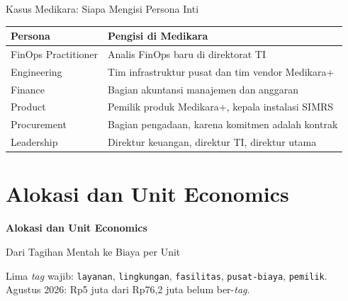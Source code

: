 \documentclass[aspectratio=169, table, 12pt]{beamer}
\begin{document}
\begin{frame}{{\Large Kasus Medikara: Siapa Mengisi Persona Inti}}
  \footnotesize
  \begin{tabularx}{\textwidth}{>{\raggedright\arraybackslash}p{3.4cm}
      >{\raggedright\arraybackslash}X}
    \hline
    \textbf{Persona} & \textbf{Pengisi di Medikara} \\
    \hline
    FinOps Practitioner & Analis FinOps baru di direktorat TI \\
    \hline
    Engineering & Tim infrastruktur pusat dan tim vendor Medikara+ \\
    \hline
    Finance & Bagian akuntansi manajemen dan anggaran \\
    \hline
    Product & Pemilik produk Medikara+, kepala instalasi SIMRS \\
    \hline
    Procurement & Bagian pengadaan, karena komitmen adalah kontrak \\
    \hline
    Leadership & Direktur keuangan, direktur TI, direktur utama \\
    \hline
  \end{tabularx}
\end{frame}

\section{Alokasi dan Unit Economics}

\begin{frame}{\hfill}
  \centering
  \Huge{\textbf{Alokasi dan Unit Economics}}
\end{frame}

\begin{frame}{{\Large Dari Tagihan Mentah ke Biaya per Unit}}
  \centering

  \vspace{6pt}
  {\small Lima \textit{tag} wajib: \texttt{layanan}, \texttt{lingkungan},
  \texttt{fasilitas}, \texttt{pusat-biaya}, \texttt{pemilik}. Agustus 2026:
  Rp5 juta dari Rp76,2 juta belum ber-\textit{tag}.}
\end{frame}
\end{document}
